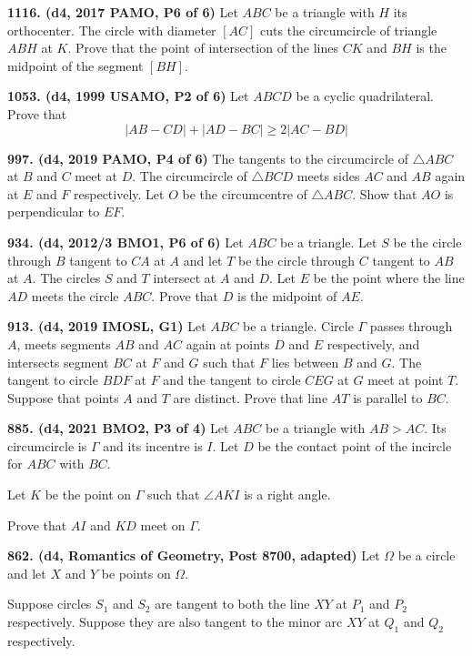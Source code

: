\documentclass{article}
\begin{document}
\textbf{1116. (\color{red}d4\color{black}, 2017 PAMO, P6 of 6)} Let $ABC$ be a triangle with $H$ its orthocenter. The circle with diameter $[AC]$ cuts the circumcircle of triangle $ABH$ at $K$. Prove that the point of intersection of the lines $CK$ and $BH$ is the midpoint of the segment $[BH]$.

\textbf{1053. (\color{red}d4\color{black}, 1999 USAMO, P2 of 6)} Let $A B C D$ be a cyclic quadrilateral. Prove that
$$
    |A B-C D|+|A D-B C| \geq 2|A C-B D|
$$

\textbf{997. (\color{red}d4\color{black}, 2019 PAMO, P4 of 6)} The tangents to the circumcircle of $\triangle ABC$ at $B$ and $C$ meet at $D$. The circumcircle of $\triangle BCD$ meets sides $AC$ and $AB$ again at $E$ and $F$ respectively. Let $O$ be the circumcentre of $\triangle ABC$. Show that $AO$ is perpendicular to $EF$.

\textbf{934. (\color{red}d4\color{black}, 2012/3 BMO1, P6 of 6)} Let $ABC$ be a triangle. Let $S$ be the circle through $B$ tangent to $CA$ at $A$ and let $T$ be the circle through $C$ tangent to $AB$ at $A$. The circles $S$ and $T$ intersect at $A$ and $D$. Let $E$ be the point where the line $AD$ meets the circle $ABC$. Prove that $D$ is the midpoint of $AE$.

\textbf{913. (\color{red}d4\color{black}, 2019 IMOSL, G1)} Let $ABC$ be a triangle. Circle $\Gamma$ passes through $A$, meets segments $AB$ and $AC$ again at points $D$ and $E$ respectively, and intersects segment $BC$ at $F$ and $G$ such that $F$ lies between $B$ and $G$. The tangent to circle $BDF$ at $F$ and the tangent to circle $CEG$ at $G$ meet at point $T$. Suppose that points $A$ and $T$ are distinct. Prove that line $AT$ is parallel to $BC$.

\textbf{885. (\color{red}d4\color{black}, 2021 BMO2, P3 of 4)} Let $ABC$ be a triangle with $AB>AC$. Its circumcircle is $\Gamma$ and its incentre is $I$. Let $D$ be the contact point of the incircle for $ABC$ with $BC$.

Let $K$ be the point on $\Gamma$ such that $\angle AKI$ is a right angle.

Prove that $AI$ and $KD$ meet on $\Gamma$.

\textbf{862. (\color{red}d4\color{black}, Romantics of Geometry, Post 8700, adapted)} Let $\Omega$ be a circle and let $X$ and $Y$ be points on $\Omega$.

Suppose circles $S_1$ and $S_2$ are tangent to both the line $XY$ at $P_1$ and $P_2$ respectively. Suppose they are also tangent to the minor arc $XY$ at $Q_1$ and $Q_2$ respectively.
\end{document}
